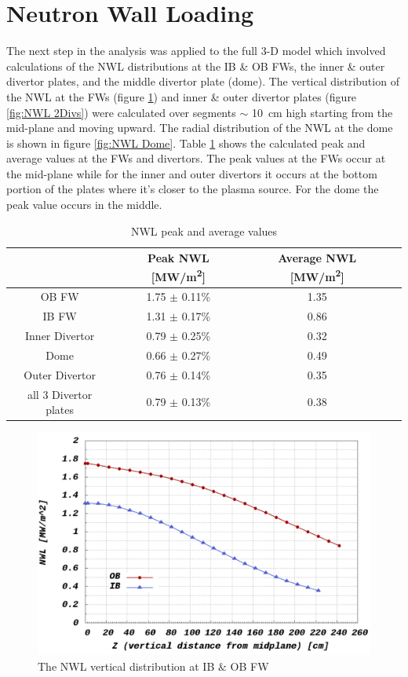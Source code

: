 \documentclass[12pt, letterpaper]{elsarticle}
\begin{document}
\section{Neutron Wall Loading} \label{Neutron Wall Loading}
The next step in the analysis was applied to the full 3-D model which involved calculations of the NWL distributions at the IB \& OB FWs, the inner \& outer divertor plates, and the middle divertor plate (dome). The vertical distribution of the NWL at the FWs (figure \ref{fig:NWL FWs}) and inner \& outer divertor plates (figure \ref{fig:NWL 2Divs}) were calculated over segments $\sim$ \SI{10}{cm} high starting from the mid-plane and moving upward. The radial distribution of the NWL at the dome is shown in figure \ref{fig:NWL Dome}. Table \ref{NWL peak and average values} shows the calculated peak and average values at the FWs and divertors. The peak values at the FWs occur at the mid-plane while for the inner and outer divertors it occurs at the bottom portion of the plates where it's closer to the plasma source. For the dome the peak value occurs in the middle.  
\begin{table}[h!]
	\caption{NWL peak and average values}
	\label{NWL peak and average values}
	\begin{tabular}{ |c|c|c|c| } 
		\hline
		 {} & Peak NWL [MW/m\textsuperscript{2}] & Average NWL [MW/m\textsuperscript{2}] \\
		\hline
		{OB FW} & 1.75 $\pm$ 0.11\% & 1.35 \\
		\hline
		{IB FW} & 1.31 $\pm$ 0.17\% & 0.86 \\
		\hline
		{Inner Divertor} & 0.79 $\pm$ 0.25\% & 0.32 \\
		\hline
		{Dome} & 0.66 $\pm$ 0.27\% & 0.49 \\
		\hline
		{Outer Divertor} & 0.76 $\pm$ 0.14\% & 0.35 \\
		\hline
		{all 3 Divertor plates} & 0.79 $\pm$ 0.13\% & 0.38 \\
		\hline
	\end{tabular}
\end{table}
 \begin{figure}[h!]
  \centering
  \includegraphics[scale=0.2]{../plots/NWL_FWs.png}
  \caption{The NWL vertical distribution at IB $\&$ OB FW}
  \label{fig:NWL FWs}
\end{figure}
\end{document}
